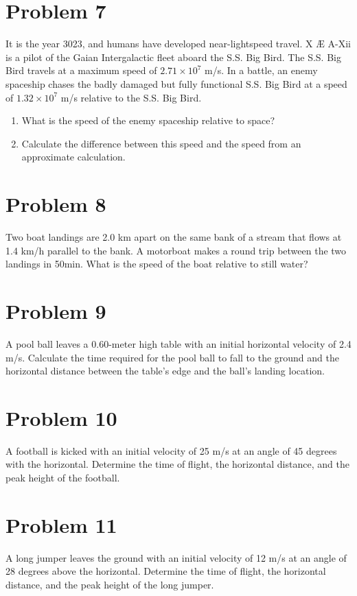 \documentclass[tikz,border=10pt]{article}
\begin{document}
\section*{Problem 7}
It is the year 3023, and humans have developed near-lightspeed travel. X Æ A-Xii is a pilot of the Gaian Intergalactic fleet aboard the S.S. Big Bird. The S.S. Big Bird travels at a maximum speed of $2.71 \times 10^{7}$ m/s. In a battle, an enemy spaceship chases the badly damaged but fully functional S.S. Big Bird at a speed of $1.32 \times 10^{7}$ m/s relative to the S.S. Big Bird.
\begin{enumerate}
    \item What is the speed of the enemy spaceship relative to space?
    \item Calculate the difference between this speed and the speed from an approximate calculation.
\end{enumerate}

\section*{Problem 8}
Two boat landings are 2.0 km apart on the same bank of a stream that flows at 1.4 km/h parallel to the bank. A motorboat makes a round trip between the two landings in 50min. What is the speed of the boat relative to still water? 

\section*{Problem 9}
A pool ball leaves a 0.60-meter high table with an initial horizontal velocity of 2.4 m/s. Calculate the time required for the pool ball to fall to the ground and the horizontal distance between the table's edge and the ball's landing location.

\section*{Problem 10}
A football is kicked with an initial velocity of 25 m/s at an angle of 45 degrees with the horizontal. Determine the time of flight, the horizontal distance, and the peak height of the football.

\section*{Problem 11}
A long jumper leaves the ground with an initial velocity of 12 m/s at an angle of 28 degrees above the horizontal. Determine the time of flight, the horizontal distance, and the peak height of the long jumper.
\end{document}
